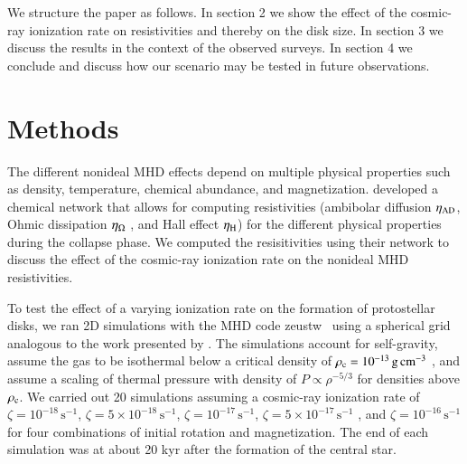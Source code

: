 \documentclass{aa}
\newcommand{\unit}[1]{\ensuremath{\, \mathrm{#1}}}
\newcommand{\zeustw}{{\sc zeustw}}          %
\begin{document}
We structure the paper as follows. In section 2 we show the effect of the cosmic-ray ionization rate on resistivities and thereby on the disk size. In section 3 we discuss the results in the context of the observed surveys. In section 4 we conclude and discuss  how our scenario may be tested in future observations.

\section{Methods}
The different nonideal MHD effects depend on multiple physical properties such as density, temperature, chemical abundance, and magnetization. \cite{Zhao2016} developed a chemical network that allows for computing resistivities (ambibolar diffusion $\eta_{\rm AD}$, Ohmic dissipation $\eta_{\rm \Omega}$ 
, and Hall effect $\eta_{\rm H}$) for the different physical properties during the collapse phase. 
We computed the resisitivities using their network
to discuss the effect of the cosmic-ray ionization rate on the nonideal MHD resistivities. 

To test the effect of a varying ionization rate on the formation of protostellar disks, we ran 2D simulations with the MHD code \zeustw\ \citep{Krasnopolsky2010} using a spherical grid analogous to the work presented by \citet{Zhao2016}. The simulations account for self-gravity, assume the gas to be isothermal below a critical density of $\rho_{\rm c}=10^{-13} \unit{g}\unit{cm}^{-3}$ , and assume a scaling of thermal pressure with density of $P\propto\rho^{-5/3}$ for densities above $\rho_{\rm c}$.   We carried out 20 simulations assuming a cosmic-ray ionization rate of $\zeta = 10^{-18}\unit{s}^{-1}$, $\zeta = 5\times10^{-18}\unit{s}^{-1}$, $\zeta = 10^{-17}\unit{s}^{-1}$, $\zeta = 5 \times 10^{-17}\unit{s}^{-1}$ , and $\zeta = 10^{-16}\unit{s}^{-1}$ for four combinations of initial rotation and magnetization. 
The end of each simulation was at about 20 kyr after the formation of the central star.  
\end{document}
